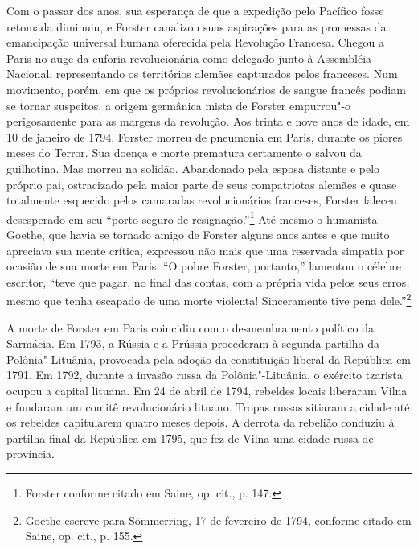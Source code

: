 Com o passar dos anos, sua esperança de que a expedição pelo Pacífico
fosse retomada diminuiu, e Forster canalizou suas aspirações para as
promessas da emancipação universal humana oferecida pela Revolução
Francesa. Chegou a Paris no auge da euforia revolucionária como delegado
junto à Assembléia Nacional, representando os territórios alemães
capturados pelos franceses. Num movimento, porém, em que os próprios
revolucionários de sangue francês podiam se tornar suspeitos, a origem
germânica mista de Forster empurrou"-o perigosamente para as margens da
revolução. Aos trinta e nove anos de idade, em 10 de janeiro de 1794,
Forster morreu de pneumonia em Paris, durante os piores meses do Terror.
Sua doença e morte prematura certamente o salvou da guilhotina. Mas
morreu na solidão. Abandonado pela esposa distante e pelo próprio pai,
ostracizado pela maior parte de seus compatriotas alemães e quase
totalmente esquecido pelos camaradas revolucionários franceses, Forster
faleceu desesperado em seu ``porto seguro de resignação.''\footnote{Forster
  conforme citado em Saine, op. cit., p. 147.} Até mesmo o humanista
Goethe, que havia se tornado amigo de Forster alguns anos antes e que
muito apreciava sua mente crítica, expressou não mais que uma reservada
simpatia por ocasião de sua morte em Paris. ``O pobre Forster,
portanto,'' lamentou o célebre escritor, ``teve que pagar, no final das
contas, com a própria vida pelos seus erros, mesmo que tenha escapado de
uma morte violenta! Sinceramente tive pena dele.''\footnote{Goethe
  escreve para Sömmerring, 17 de fevereiro de 1794, conforme citado em
  Saine, op. cit., p. 155.}

A morte de Forster em Paris coincidiu com o desmembramento político da
Sarmácia. Em 1793, a Rússia e a Prússia procederam à segunda partilha da
Polônia"-Lituânia, provocada pela adoção da constituição liberal da
República em 1791. Em 1792, durante a invasão russa da Polônia"-Lituânia,
o exército tzarista ocupou a capital lituana. Em 24 de abril de 1794,
rebeldes locais liberaram Vilna e fundaram um comitê revolucionário
lituano. Tropas russas sitiaram a cidade até os rebeldes capitularem
quatro meses depois. A derrota da rebelião conduziu à partilha final da
República em 1795, que fez de Vilna uma cidade russa de província.

%

